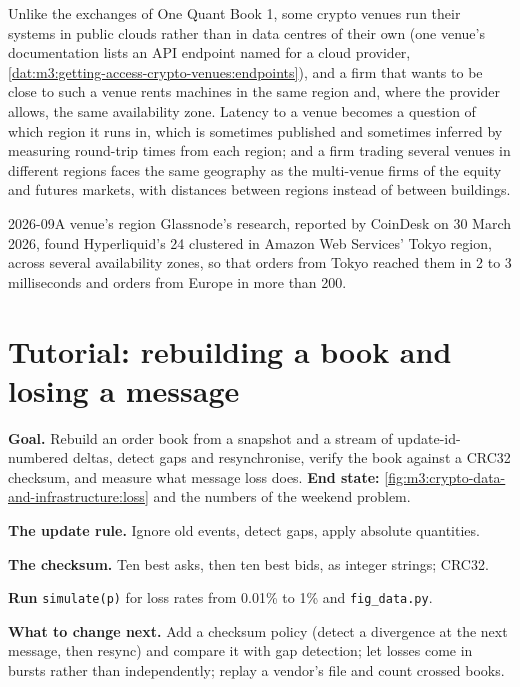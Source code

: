 Unlike the exchanges of One Quant Book 1, some crypto venues run their systems in public clouds rather than in data centres of their own (one venue's
documentation lists an API endpoint named for a cloud provider, \cref{dat:m3:getting-access-crypto-venues:endpoints}), and a firm that wants to be close to such a
venue rents machines in the same region and, where the provider allows, the same availability zone. Latency to a venue becomes a question of which
region it runs in, which is sometimes published and sometimes inferred by measuring round-trip times from each region; and a firm trading several venues in
different regions faces the same geography as the multi-venue firms of the equity and futures markets, with distances between regions instead of between
buildings.

\begin{dated}{2026-09}{A venue's region}\label{dat:m3:crypto-data-and-infrastructure:region}
Glassnode's research, reported by CoinDesk on 30 March 2026, found Hyperliquid's 24  clustered in Amazon Web Services' Tokyo region, across
several availability zones, so that orders from Tokyo reached them in 2 to 3 milliseconds and orders from Europe in more than 200.
\end{dated}

\section{Tutorial: rebuilding a book and losing a message}\label{tut:m3:crypto-data-and-infrastructure:book}

\begin{tutorial}
\textbf{Goal.} Rebuild an order book from a snapshot and a stream of update-id-numbered deltas, detect gaps and resynchronise, verify the book against a CRC32
checksum, and measure what message loss does. \textbf{End state:} \cref{fig:m3:crypto-data-and-infrastructure:loss} and the numbers of the weekend problem.
\begin{tutsteps}
\item \textbf{The update rule.} Ignore old events, detect gaps, apply absolute quantities.
\label{lst:m3:crypto-data-and-infrastructure:apply}
\item \textbf{The checksum.} Ten best asks, then ten best bids, as integer strings; CRC32.
\label{lst:m3:crypto-data-and-infrastructure:checksum}
\item \textbf{Run} \texttt{simulate(p)} for loss rates from 0.01\% to 1\% and \texttt{fig\_data.py}.
\end{tutsteps}
\textbf{What to change next.} Add a checksum policy (detect a divergence at the next message, then resync) and compare it with gap detection; let losses come in
bursts rather than independently; replay a vendor's file and count crossed books.
\end{tutorial}

